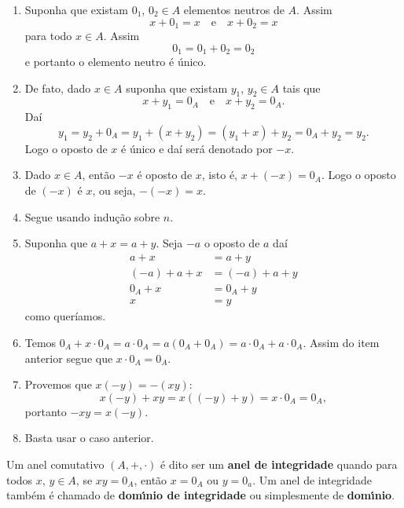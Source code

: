 \begin{prova}
	\begin{enumerate}[label={\roman*})]
		\item Suponha que existam $0_1$, $0_2\in A$ elementos neutros de $A$. Assim
		\[
			x + 0_1 = x \quad \mbox{e}\quad x + 0_2 = x	
		\]
		para todo $x \in A$. Assim
		\[
			0_1 = 0_1 + 0_2 = 0_2
		\]
		e portanto o elemento neutro é único.

		\item De fato, dado $x \in A$ suponha que existam $y_1$, $y_2\in A$ tais que
		\[
			x + y_1 = 0_A \quad \mbox{e}\quad x + y_2 = 0_A.
		\]
		Daí
		\[
			y_1 = y_2 + 0_A = y_1 + (x + y_2) = (y_1 + x) + y_2 = 0_A + y_2 =y_2.
		\]
		Logo o oposto de $x$ é único  e daí será denotado por $-x$.
		
		\item Dado $x \in A$, então $-x$ {\'e} oposto de $x$, isto {\'e}, $x + (-x) = 0_A$. Logo o oposto de $(-x)$ {\'e} $x$, ou seja, $-(-x) = x$.

		\item Segue usando indução sobre $n$.

		\item Suponha que $a + x = a + y$. Seja $-a$ o oposto de $a$ daí
		\begin{align*}
			a + x &= a + y\\
			(-a) + a + x &= (-a) + a + y\\
			0_A + x &= 0_A + y\\
			x & = y
		\end{align*}
		como queríamos.

		\item Temos $0_A + x\cdot 0_A = a\cdot 0_A = a(0_A + 0_A) = a\cdot 0_A + a\cdot 0_A$. Assim do item anterior segue que $x\cdot 0_A = 0_A$.

		\item Provemos que $x(-y) = -(xy)$:
		\[
			x(-y) + xy = x((-y) + y) = x\cdot 0_A = 0_A,
		\]
		portanto $-xy = x(-y)$.

		\item Basta usar o caso anterior.
	\end{enumerate}
\end{prova}

\begin{definicao}
	Um anel comutativo $(A, + , \cdot)$ {\'e} dito ser um \textbf{anel de integridade} quando para todos 
	$x$, $y \in A$, se $xy = 0_A$, ent{\~a}o $x = 0_A$ ou $y = 0_a$. Um anel de integridade tamb{\'e}m {\'e} chamado de \textbf{dom{\'\i}nio de integridade} ou simplesmente de \textbf{dom{\'\i}nio}.
\end{definicao}

